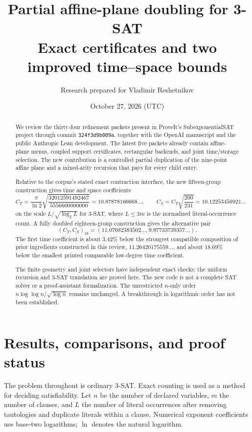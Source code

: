 \documentclass[11pt]{article}
\title{Partial affine-plane doubling for 3-SAT\\[5pt]
\large Exact certificates and two improved time--space bounds}
\author{Research prepared for Vladimir Reshetnikov}
\date{October 27, 2026 \quad (UTC)}
\begin{document}
\maketitle
\begin{abstract}
We review the thirty-four refinement packets present in ProveIt's
SubexponentialSAT project through commit \texttt{324f3d9b009a}, together
with the OpenAI manuscript and the public Anthropic Lean development.
The latest five packets already contain affine-plane menus, coupled
support certificates, rectangular backends, and joint time/storage
selection. The new contribution is a controlled partial duplication of
the nine-point affine plane and a mixed-arity recursion that pays for
every child entry.

Relative to the corpus's stated exact contraction interface, the new
fifteen-group construction gives time and space coefficients
\[
 C_T=\frac\pi{\ln2}\sqrt{\frac{32012591492467}{5556600000000}}
 =10.87878166668\ldots,\qquad
 C_S=C_T\sqrt{\frac{200}{231}}=10.12253456921\ldots
\]
on the scale $L/\sqrt{\log_2 L}$ for 3-SAT, where $L\le3m$ is the
normalized literal-occurrence count. A fully doubled eighteen-group
construction gives the alternative pair
\[
 (C_T,C_S)_{18}=(11.07682383502\ldots,9.97733739357\ldots).
\]
The first time coefficient is about $3.42\%$ below the strongest compatible
composition of prior ingredients constructed in this review,
$11.26420175559\ldots$, and about $18.69\%$ below the smallest printed
comparable low-degree time coefficient.

The finite geometry and joint selectors have independent exact checks;
the uniform recursion and 3-SAT translation are proved here.
The new code is not a complete SAT solver or a proof-assistant formalization.
The unrestricted $n$-only order
$n\log\log n/\sqrt{\log n}$ remains unchanged. A breakthrough in
logarithmic order has not been established.
\end{abstract}
\newpage
\setcounter{tocdepth}{1}\tableofcontents\medskip

\section{Results, comparisons, and proof status}
\label{sec:results}

The problem throughout is ordinary 3-SAT. Exact counting is used as a
method for deciding satisfiability. Let $n$ be the number of declared
variables, $m$ the number of clauses, and $L$ the number of literal
occurrences after removing tautologies and duplicate literals within a
clause. Numerical exponent coefficients use base-two logarithms;
$\ln$ denotes the natural logarithm.
\end{document}
